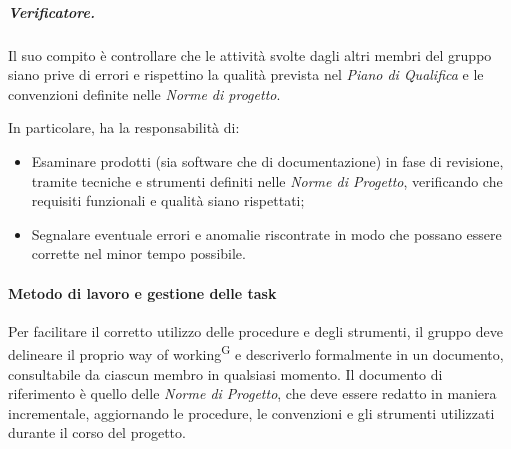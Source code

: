 \subparagraph{Verificatore.}
Il suo compito è controllare che le attività svolte dagli altri membri del gruppo siano prive di errori e rispettino la qualità prevista nel \textit{Piano di Qualifica} e le convenzioni definite nelle \textit{Norme di progetto}. %

In particolare, ha la responsabilità di:
\begin{itemize}
    \item Esaminare prodotti (sia software che di documentazione) in fase di revisione, tramite tecniche e strumenti definiti nelle \textit{Norme di Progetto}, verificando che requisiti funzionali e qualità siano rispettati;
    \item Segnalare eventuale errori e anomalie riscontrate in modo che possano essere corrette nel minor tempo possibile.
\end{itemize}

\paragraph{Metodo di lavoro e gestione delle task}\label{sec:pianificazione:gestione_task}
Per facilitare il corretto utilizzo delle procedure e degli strumenti, il gruppo deve delineare il proprio way of working\textsuperscript{G} e descriverlo formalmente in un documento, consultabile da ciascun membro in qualsiasi momento.  Il documento di riferimento è quello delle \textit{Norme di Progetto}, che deve essere redatto in maniera incrementale, aggiornando le procedure, le convenzioni e gli strumenti utilizzati durante il corso del progetto.

